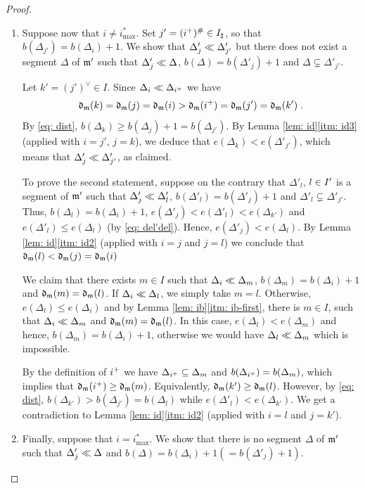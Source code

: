 \documentclass{ert-l} %
\begin{document}
\begin{proof}
\begin{enumerate}
\begin{enumerate}
\item Suppose now that $i\ne i^*_{\max}$.
Set $j' = (i^+)^\#\in I_{\sharp}$, so that $b(\Delta_{j'})=b(\Delta_i)+1$.
We show that $\Delta'_j \ll \Delta'_{j'}$ but there does not exist a segment $\Delta$ of $\mathfrak{m}'$
such that $\Delta'_j\ll\Delta$, $b(\Delta)=b(\Delta'_j)+1$ and $\Delta\subsetneq\Delta'_{j'}$.

Let $k' = (j')^\vee\in I$. Since $\Delta_i\ll\Delta_{i^+}$ we have
\[
\mathfrak{d}_{\mathfrak{m}}(k)=\mathfrak{d}_{\mathfrak{m}}(j)=\mathfrak{d}_{\mathfrak{m}}(i)> \mathfrak{d}_{\mathfrak{m}}(i^+) = \mathfrak{d}_{\mathfrak{m}}(j')= \mathfrak{d}_{\mathfrak{m}}(k')\;.
\]
By \eqref{eq: dist}, $b(\Delta_k)\geq b(\Delta_j)+1 = b(\Delta_{j'})$.
By Lemma \ref{lem: id}\eqref{itm: id3} (applied with $i=j'$, $j=k$), we deduce that
$e(\Delta_k)< e(\Delta'_{j'})$, which means that $\Delta'_j \ll \Delta'_{j'}$, as claimed.

To prove the second statement, suppose on the contrary that $\Delta'_l$, $l\in I'$ is a segment of $\mathfrak{m}'$
such that $\Delta'_j\ll\Delta'_l$, $b(\Delta'_l)=b(\Delta'_j)+1$ and $\Delta'_l\subsetneq\Delta'_{j'}$.
Thus, $b(\Delta_l)=b(\Delta_i)+1$, $e(\Delta'_j)<e(\Delta'_l)<e(\Delta_{k'})$ and $ e(\Delta'_l)\leq e(\Delta_l)$ (by \eqref{eq: del'del}).
Hence, $e(\Delta'_j)<e(\Delta_l)$.
By Lemma \ref{lem: id}\eqref{itm: id2} (applied with $i=j$ and $j=l$) we conclude that $\mathfrak{d}_{\mathfrak{m}}(l) < \mathfrak{d}_{\mathfrak{m}}(j)=\mathfrak{d}_{\mathfrak{m}}(i)$

We claim that there exists $m\in I$ such that $\Delta_i\ll\Delta_m$, $b(\Delta_m) = b(\Delta_i)+1$ and $\mathfrak{d}_{\mathfrak{m}}(m) = \mathfrak{d}_{\mathfrak{m}}(l)$.
If $\Delta_i\ll \Delta_l$, we simply take $m=l$. Otherwise, $e(\Delta_l)\le e(\Delta_i)$ and by Lemma \ref{lem: ib}\eqref{itm: ib-first},
there is $m\in I$, such that $\Delta_i\ll \Delta_m$ and $\mathfrak{d}_{\mathfrak{m}}(m) = \mathfrak{d}_{\mathfrak{m}}(l)$.
In this case, $e(\Delta_l)<e(\Delta_m)$ and hence, $b(\Delta_m) = b(\Delta_i)+1$, otherwise we would have $\Delta_l\ll\Delta_m$
which is impossible.

By the definition of $i^+$ we have $\Delta_{i^+}\subseteq \Delta_m$ and $b(\Delta_{i^+})=b(\Delta_m)$,
which implies that $\mathfrak{d}_{\mathfrak{m}}(i^+) \geq \mathfrak{d}_{\mathfrak{m}}(m)$.
Equivalently, $\mathfrak{d}_{\mathfrak{m}}(k')\ge\mathfrak{d}_{\mathfrak{m}}(l)$.
However, by \eqref{eq: dist}, $b(\Delta_{k'})>b(\Delta_{j'})=b(\Delta_l)$ while $e(\Delta'_l)<e(\Delta_{k'})$.
We get a contradiction to Lemma \ref{lem: id}\eqref{itm: id2} (applied with $i=l$ and $j=k'$).

\item
Finally, suppose that $i=i^*_{\max}$.
We show that there is no segment $\Delta$ of $\mathfrak{m}'$ such that $\Delta'_j\ll\Delta$
and $b(\Delta)=b(\Delta_i)+1(=b(\Delta'_j)+1)$.


\end{enumerate}
\end{enumerate}
\end{proof}
\end{document}

